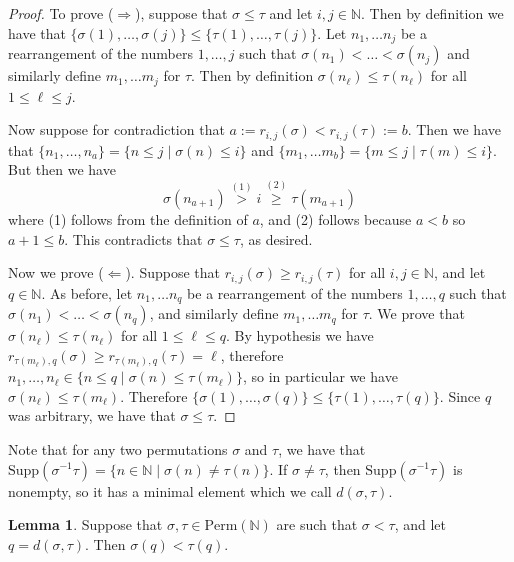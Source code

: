 \documentclass[oneside,11pt]{amsart}
\newcommand{\nn}{\ensuremath{\mathbb{N}}}
\newcommand{\Perm}{\ensuremath{\text{Perm}}}
\newcommand{\Supp}{\ensuremath{\text{Supp}}}
\theoremstyle{definition}
\newtheorem{proof techniques}{Proof Techniques}
\newtheorem{lemma}{Lemma}
\begin{document}
\begin{proof}
To prove ($\Rightarrow$), suppose that $\sigma \leq \tau$ and let $i , j \in \nn$. Then by definition we have that $\{ \sigma(1) , \ldots , \sigma(j) \} \leq \{ \tau(1) , \ldots , \tau(j) \}$. Let $n_1 , \ldots n_j$ be a rearrangement of the numbers $1 , \ldots , j$ such that $\sigma(n_1) < \ldots < \sigma(n_j)$ and similarly define $m_1 , \ldots m_j$ for $\tau$. Then by definition $\sigma(n_\ell) \leq \tau(n_\ell)$ for all $1 \leq \ell \leq j$. 


Now suppose for contradiction that $a:= r_{i , j}(\sigma) < r_{i , j}(\tau):= b$. Then we have that $\{ n_1, \ldots, n_a \} = \{ n \leq j \mid \sigma(n) \leq i \}$ and $\{ m_1 , \ldots m_b \} = \{ m \leq j \mid \tau(m) \leq i \}$. But then we have 
\begin{equation*}
\sigma(n_{a + 1}) \overset{(1)}{>} i \overset{(2)}{\geq} \tau(m_{a + 1})
\end{equation*}
where (1) follows from the definition of $a$, and (2) follows because $a < b$ so $a + 1 \leq b$. This contradicts that $\sigma \leq \tau$, as desired. 

Now we prove ($\Leftarrow$). Suppose that $r_{i , j}(\sigma) \geq r_{i , j}(\tau)$ for all $i, j \in \nn$, and let $q \in \nn$. As before, let $n_1 , \ldots n_q$ be a rearrangement of the numbers $1 , \ldots , q$ such that $\sigma(n_1) < \ldots < \sigma(n_q)$, and similarly define $m_1 , \ldots m_q$ for $\tau$. We prove that $\sigma(n_\ell)  \leq \tau(n_\ell)$ for all $1 \leq \ell \leq q$. By hypothesis we have $r_{\tau(m_\ell) , q}(\sigma) \geq r_{\tau(m_\ell) , q}(\tau) = \ell$, therefore $n_1, \ldots, n_\ell \in \{ n \leq q \mid \sigma(n) \leq \tau(m_\ell) \}$, so in particular we have $\sigma(n_\ell) \leq \tau(m_\ell)$. Therefore $\{ \sigma(1) , \ldots , \sigma(q) \} \leq \{ \tau(1) , \ldots , \tau(q) \}$. Since $q$ was arbitrary, we have that $\sigma \leq \tau$. 
\end{proof}



Note that for any two permutations $\sigma$ and $\tau$, we have that $\Supp(\sigma^{-1} \tau) = \{ n \in \nn \mid \sigma(n) \neq \tau(n) \}$. If $\sigma \neq \tau$, then $\Supp(\sigma^{-1} \tau)$ is nonempty, so it has a minimal element which we call $d(\sigma , \tau)$. 



\begin{lemma}\label{lem: less than in bruhat implies first differing place less than}
Suppose that $\sigma , \tau \in \Perm(\nn)$ are such that $\sigma < \tau$, and let $q = d(\sigma , \tau)$. Then $\sigma(q) < \tau(q)$. 
\end{lemma}
\end{document}
